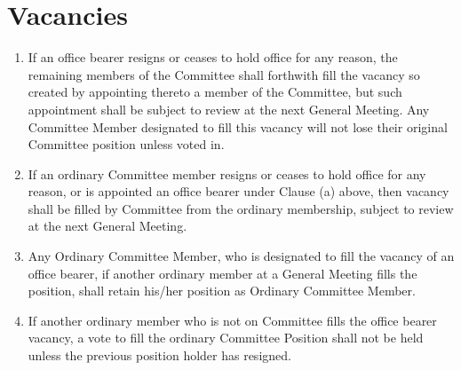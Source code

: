 \documentclass[10pt,a4paper]{report}
\begin{document}
	\section{Vacancies}
		\begin{enumerate}[label=\alph*]
			\item If an office bearer resigns or ceases to hold office for any reason, the remaining members of the Committee shall forthwith fill the vacancy so created by appointing thereto a member of the	Committee, but such appointment shall be subject to review at the next General Meeting. Any Committee Member designated to fill this vacancy will not lose their original Committee position unless voted in.
			\item If an ordinary Committee member resigns or ceases to hold office for any reason, or is appointed an office bearer under Clause (a) above, then vacancy shall be filled by Committee from the ordinary membership, subject to review at the next General Meeting.
			\item Any Ordinary Committee Member, who is designated to fill the vacancy of an office bearer, if another ordinary member at a General Meeting fills the position, shall retain his/her position as Ordinary Committee Member.
			\item If another ordinary member who is not on Committee fills the office bearer vacancy, a vote to fill the ordinary Committee Position shall not be held unless the previous position holder has resigned.
		\end{enumerate}
\end{document}
